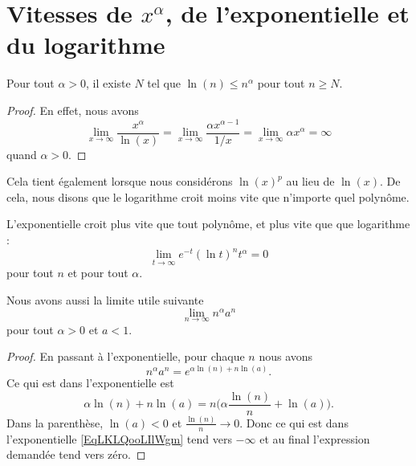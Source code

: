 \section{Vitesses de $x^{\alpha}$, de l'exponentielle et du logarithme}

\begin{lemma}   \label{LemSYHKooUiSMFJ}
    Pour tout \( \alpha>0\), il existe \( N\) tel que \( \ln(n)\leq n^{\alpha}\) pour tout \( n\geq N\).
\end{lemma}

\begin{proof}
En effet, nous avons
\begin{equation}
    \lim_{x\to\infty} \frac{ x^{\alpha} }{ \ln(x) }=\lim_{x\to\infty} \frac{ \alpha x^{\alpha-1} }{ 1/x }=\lim_{x\to\infty} \alpha x^{\alpha}=\infty
\end{equation}
quand $\alpha>0$. 
\end{proof}
Cela tient également lorsque nous considérons $\ln(x)^p$ au lieu de $\ln(x)$. De cela, nous disons que le logarithme croit moins vite que n'importe quel polynôme. 

\begin{lemma}
    L'exponentielle croit plus vite que tout polynôme, et plus vite que que logarithme :
    \begin{equation}        \label{EqExpDecrtPlusVite}
        \lim_{t\to\infty} e^{-t}(\ln t)^{n}t^{\alpha}=0
    \end{equation}
    pour tout $n$ et pour tout $\alpha$.
\end{lemma}

\begin{lemma}       \label{LemVKDKooEftNzG}
    Nous avons aussi la limite utile suivante 
    \begin{equation}
        \lim_{n\to \infty} n^{\alpha}a^n
    \end{equation}
    pour tout \( \alpha>0\) et \( a<1\).
\end{lemma}

\begin{proof}
    En passant à l'exponentielle, pour chaque \( n\) nous avons
    \begin{equation}        \label{EqLKLQooLIlWgm}
        n^{\alpha}a^n= e^{\alpha\ln(n)+n\ln(a)}.
    \end{equation}
    Ce qui est dans l'exponentielle est
    \begin{equation}
        \alpha\ln(n)+n\ln(a)=n\big(\alpha \frac{ \ln(n) }{ n }+\ln(a) \big).
    \end{equation}
    Dans la parenthèse, \( \ln(a)<0\) et \( \frac{ \ln(n) }{ n }\to 0\). Donc ce qui est dans l'exponentielle \eqref{EqLKLQooLIlWgm} tend vers \( -\infty\) et au final l'expression demandée tend vers zéro.
\end{proof}

